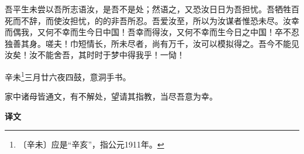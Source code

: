 \documentclass[12pt,UTF-8,openany,a4]{ctexbook}
\begin{document}
\begin{large}
    吾平生未尝以吾所志语汝，是吾不是处；然语之，又恐汝日日为吾担忧。吾牺牲百死而不辞，而使汝担忧，的的非吾所忍。吾爱汝至，所以为汝谋者惟恐未尽。汝幸而偶我，又何不幸而生今日中国！吾幸而得汝，又何不幸而生今日之中国！卒不忍独善其身。嗟夫！巾短情长，所未尽者，尚有万千，汝可以模拟得之。吾今不能见汝矣！汝不能舍吾，其时时于梦中得我乎！一恸！
    
    辛未\footnote{〔辛未〕\yiwen 应是“辛亥”，指公元1911年。}三月廿六夜四鼓，意洞手书。
    
    家中诸母皆通文，有不解处，望请其指教，当尽吾意为幸。
\end{large}


\newpage

\begin{Large}
    \noindent\textbf{译文}
\end{Large}


\vspace{1em}
\end{document}
